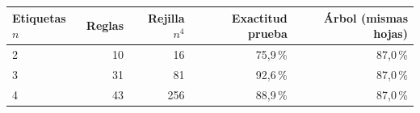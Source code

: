 \begin{tabular}{lrrrr}
\toprule
Etiquetas $n$ & Reglas & Rejilla $n^4$ & Exactitud prueba & Árbol (mismas hojas) \\
\midrule
2 & 10 & 16 & 75,9\,\% & 87,0\,\% \\
3 & 31 & 81 & 92,6\,\% & 87,0\,\% \\
4 & 43 & 256 & 88,9\,\% & 87,0\,\% \\
\bottomrule
\end{tabular}
